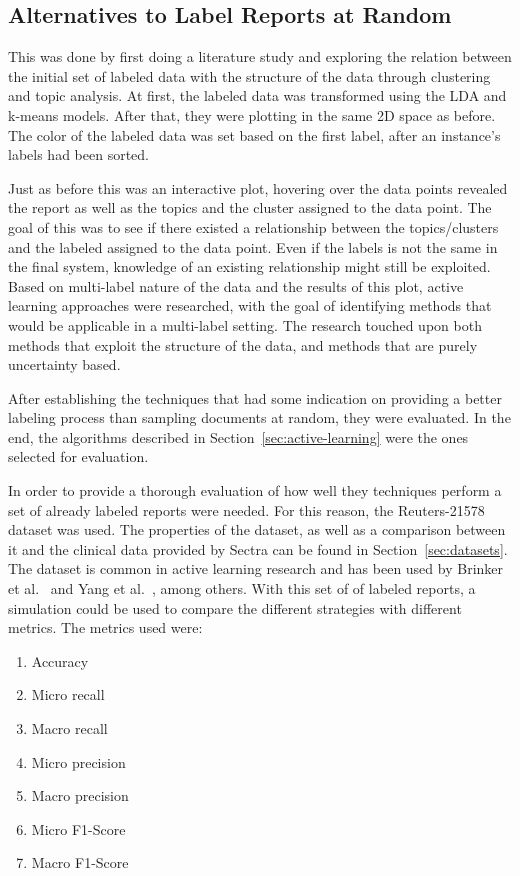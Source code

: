 \subsection{Alternatives to Label Reports at Random}\label{sec:exp1-method}

This was done by first doing a literature study and exploring the relation between the initial set of labeled data with the structure of the data through clustering and topic analysis.
At first, the labeled data was transformed using the LDA and k-means models.
After that, they were plotting in the same 2D space as before.
The color of the labeled data was set based on the first label, after an instance's labels had been sorted.

Just as before this was an interactive plot, hovering over the data points revealed the report as well as the topics and the cluster assigned to the data point.
The goal of this was to see if there existed a relationship between the topics/clusters and the labeled assigned to the data point.
Even if the labels is not the same in the final system, knowledge of an existing relationship might still be exploited.
Based on multi-label nature of the data and the results of this plot, active learning approaches were researched, with the goal of identifying methods that would be applicable in a multi-label setting.
The research touched upon both methods that exploit the structure of the data, and methods that are purely uncertainty based.

After establishing the techniques that had some indication on providing a better labeling process than sampling documents at random, they were evaluated.
In the end, the algorithms described in Section~\ref{sec:active-learning} were the ones selected for evaluation.

In order to provide a thorough evaluation of how well they techniques perform a set of already labeled reports were needed.
For this reason, the Reuters-21578 dataset was used.
The properties of the dataset, as well as a comparison between it and the clinical data provided by Sectra can be found in Section~\ref{sec:datasets}.
The dataset is common in active learning research and has been used by Brinker et al\@.~\cite{brinker2006active} and Yang et al\@.~\cite{yang2009effective}, among others.
With this set of of labeled reports, a simulation could be used to compare the different strategies with different metrics.
The metrics used were:
\begin{enumerate}
    \item Accuracy
    \item Micro recall
    \item Macro recall
    \item Micro precision
    \item Macro precision
    \item Micro F1-Score
    \item Macro F1-Score
\end{enumerate}

